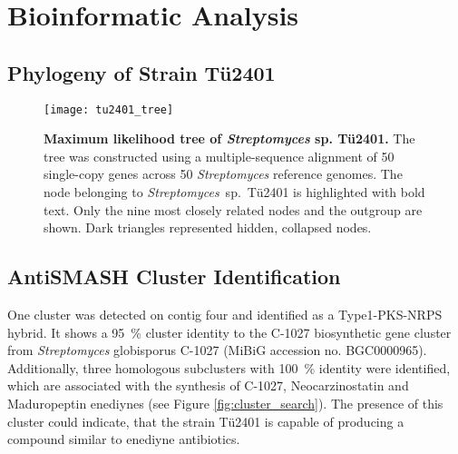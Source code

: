 

\section{Bioinformatic Analysis} %
\label{sec:species_antismash}

\subsection{Phylogeny of Strain Tü2401} %
\label{sub:phylogeny_of_strain_tue2401}

\begin{figure}[htbp]
	\texttt{[image: tu2401\_tree]}
	\caption[Maximum likelihood tree of \emph{Streptomyces} sp. Tü2401.]{%
		\textbf{Maximum likelihood tree of \emph{Streptomyces} sp. Tü2401.}
		The tree was constructed using a multiple-sequence alignment of 50 single-copy genes across 50 \textit{Streptomyces} reference genomes.
		The node belonging to \textit{Streptomyces}~sp.~Tü2401 is highlighted with bold text.
		Only the nine most closely related nodes and the outgroup are shown.
		Dark triangles represented hidden, collapsed nodes.}
	\label{fig:phylo_tree}
\end{figure}


\subsection{AntiSMASH Cluster Identification} %
\label{sub:antismash_cluster_identification}

 One cluster was detected on contig four and identified as a Type1-PKS-NRPS hybrid.
 It shows a 95~\% cluster identity to the C-1027 biosynthetic gene cluster from \textit{Streptomyces} globisporus C-1027 (MiBiG accession no. BGC0000965). Additionally, three homologous subclusters with 100~\% identity were identified, which are associated with the synthesis of C-1027, Neocarzinostatin and Maduropeptin enediynes (see Figure \ref{fig:cluster_search}).
 The presence of this cluster could indicate, that the strain Tü2401 is capable of producing a compound similar to enediyne antibiotics.


